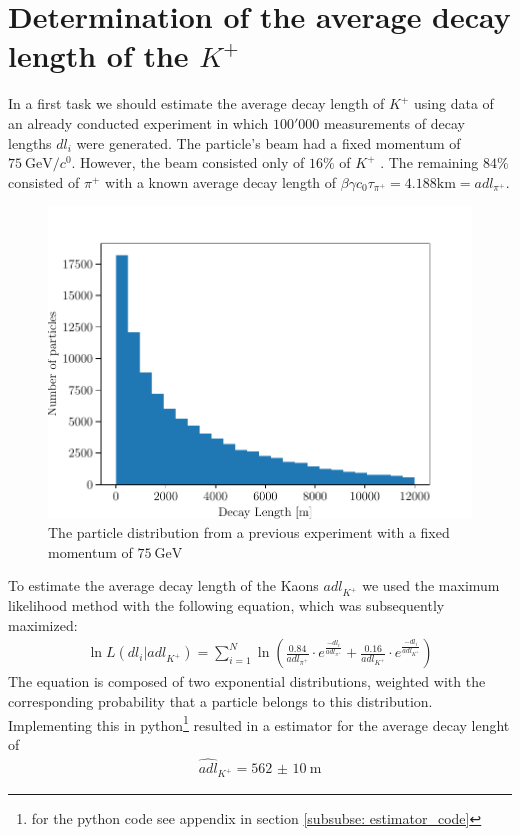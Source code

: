 \documentclass[12pt,a4paper,oneside,english]{article}
\begin{document}
\section{Determination of the average decay length of the $K^+$}
\label{sec: decay_length}
In a first task we should estimate the average decay length of $K^+$ using data of an already conducted experiment in which $100'000$ measurements
of decay lengths $dl_i$ were generated. The particle's beam had a fixed momentum of $\SI{75}{\giga\electronvolt\per\clight}$. However, the beam consisted only of $16\%$ of
$K^+$ . The remaining $84\%$ consisted of $\pi^+$ with a known average decay length of $\beta \gamma c_0 \tau_{\pi^+} = 4.188 \si{\kilo\meter} =
adl_{\pi^+}$.
\begin{figure}[H]
\centering
\includegraphics[width=0.8\linewidth]{images/histogram_decay_length.pdf}
	\caption{The particle distribution from a previous experiment with a fixed momentum of $\SI{75}{\giga\electronvolt}$}
	\label{fig:decay}
\end{figure}
To estimate the average decay length of the Kaons $adl_{K^+}$ we used the maximum likelihood method with
the following equation, which was subsequently maximized:
\begin{align}
\ln L(dl_i|adl_{K^+}) = \sum_{i=1}^{N}\ln\left(\frac{0.84}{adl_{\pi^+}}\cdot e^{\frac{-dl_i}{adl_{\pi^+}}}+\frac{0.16}{adl_{K^+}}\cdot e^{\frac{-dl_i}{adl_{K^+}}}\right)
\end{align}
The equation is composed of two exponential distributions, weighted with the corresponding probability that a particle belongs to this distribution. Implementing this in python\footnote{for the python code see appendix in section \ref{subsubse: estimator_code} } resulted in a estimator for the average decay lenght of
\begin{align}
\widehat{adl}_{K^+} = \SI{562(10)}{\meter}
\end{align}
\end{document}
